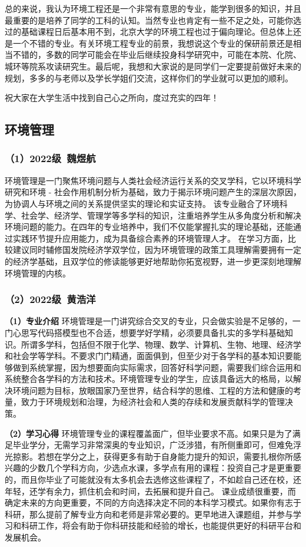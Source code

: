 \documentclass[11pt,oneside]{book}
\begin{document}
总的来说，我认为环境工程还是一个非常有意思的专业，能学到很多的知识，并且最重要的是培养了同学的工科的认知。当然专业也肯定有一些不足之处，可能你选过的基础课程日后基本用不到，北京大学的环境工程也过于偏向理论。但总体上还是一个不错的专业。有关环境工程专业的前景，我想说这个专业的保研前景还是相当不错的，多数的同学可能会在毕业后继续投身科学研究中，可能在本院、化院、城环等院系攻读研究生。最后呢，我想和大家说的是同学们一定要提前做好未来的规划，多多的与老师以及学长学姐们交流，这样你们的学业就可以更加的顺利。

祝大家在大学生活中找到自己心之所向，度过充实的四年！

\subsection{环境管理}

\subsubsection{（1）2022级\ 魏煜航}

环境管理是一门聚焦环境问题与人类社会经济运行关系的交叉学科，它以环境科学研究和环境 - 社会作用机制分析为基础，致力于揭示环境问题产生的深层次原因，为协调人与环境之间的关系提供坚实的理论和实证支持。
该专业融合了环境科学、社会学、经济学、管理学等多学科的知识，注重培养学生从多角度分析和解决环境问题的能力。在四年的专业培养中，我们不仅能掌握扎实的理论基础，还能通过实践环节提升应用能力，成为具备综合素养的环境管理人才。
在学习方面，比较建议同时辅修国发院经济学双学位，因为环境管理的政策工具理解需要拥有一定的经济学基础，且双学位的修读能够更好地帮助你拓宽视野，进一步更深刻地理解环境管理的内核。

\subsubsection{（2）2022级\ 黄浩洋}

\textbf{（1）专业介绍}
环境管理是一门讲究综合交叉的专业，只会做实验是不足够的，一门心思写代码搭模型也不合适，想要学好学精，必须要具备扎实的多学科基础知识。所谓多学科，包括但不限于化学、物理、数学、计算机、生物、地理、经济学和社会学等学科。不要求门门精通，面面俱到，但至少对于各学科的基本知识要能够做到系统掌握，因为想要面向实际需求，回答好科学问题，需要我们综合运用和系统整合各学科的方法和技术。环境管理专业的学生，应该具备远大的格局，以解决环境问题为目标，放眼国家乃至世界，结合科学的思维、工程的方法和健康的考量，致力于环境规划和治理，为经济社会和人类的存续和发展贡献科学的管理决策。

\textbf{（2）学习心得}
环境管理专业的课程覆盖面广，但毕业要求不高。如果只是为了满足毕业学分，无需学习非常深奥的专业知识，广泛涉猎，有所侧重即可，但难免浮光掠影。若想在学分之上，获得更多有助于自身能力提升的知识，需要扎根你所感兴趣的少数几个学科方向，少选点水课，多学点有用的课程：投资自己才是更重要的，而且你毕业了可能就没有太多机会去选修这些课程了，不如趁自己还在校，还年轻，还学有余力，抓住机会和时间，去拓展和提升自己。
课业成绩很重要，而确定未来的方向更重要，不同的方向选择决定不同的本科学习模式。如果你有志于科研，那么提前了解专业方向和老师是非常必要的。更早地进入课题组，并参与学习和科研工作，将会有助于你科研技能和经验的增长，也能提供更好的科研平台和发展机会。
\end{document}
